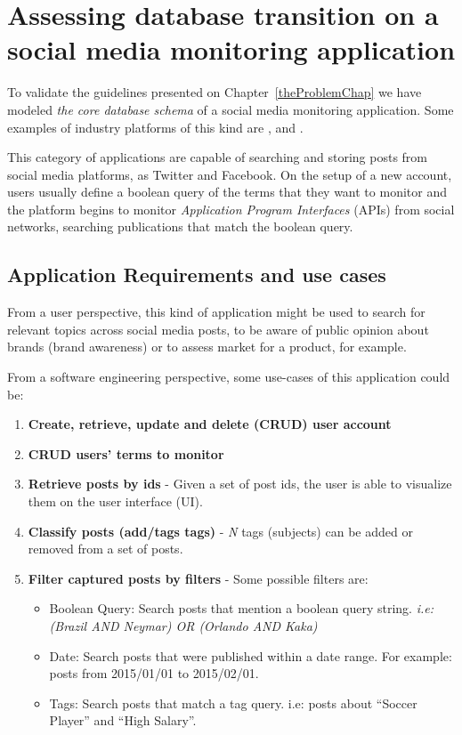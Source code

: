 \section{Assessing database transition on a social media monitoring application}
\label{socmediamonitoringapp}

To validate the guidelines presented on Chapter~\ref{theProblemChap} we have modeled \textit{the core database schema} of a social media monitoring  application. Some examples of industry platforms of this kind are \cite{sproutsocial}, \cite{mention} and \cite{buzzmonitor}. 

This category of applications are capable of searching and storing posts from social media platforms, as Twitter and Facebook. On the setup of a new account, users usually define a boolean query of the terms that they want to monitor and the platform begins to monitor \textit{Application Program Interfaces} (APIs) from social networks, searching publications that match the boolean query. 

\subsection{Application Requirements and use cases}
\label{appoperations}
From a user perspective, this kind of application might be used to search for relevant topics across social media posts, to be aware of public opinion about brands (brand awareness) or to assess market for a product, for example. 

From a software engineering perspective, some use-cases of this application could be:

\begin{enumerate}
\item{\textbf{Create, retrieve, update and delete (CRUD) user account}}
\item{\textbf{CRUD users' terms to monitor}}


\item{\textbf{Retrieve posts by ids} - Given a set of post ids, the user is able to visualize them on the user interface (UI).}

\item{\textbf{Classify posts (add/tags tags)} - \textit{N} tags (subjects) can be added or removed from a set of posts.}

\item{\textbf{Filter captured posts by filters} - Some possible filters are: 
\begin{itemize}
\item{Boolean Query:} Search posts that mention a boolean query string. \textit{i.e: (Brazil AND Neymar) OR (Orlando AND Kaka)}
\item{Date:} Search posts that were published within a date range. For example: posts from 2015/01/01 to 2015/02/01.
\item{Tags:} Search posts that match a tag query. i.e: posts about ``Soccer Player'' and ``High Salary''.
\end{itemize}
}

\end{enumerate}

